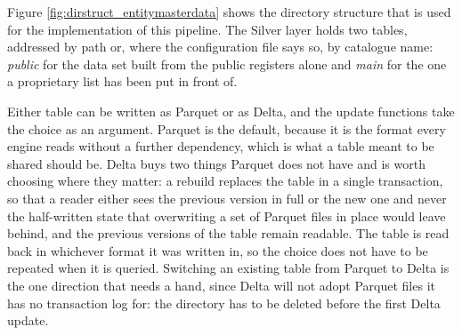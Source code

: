 Figure \ref{fig:dirstruct_entitymasterdata} shows the directory structure that is used for the implementation of this pipeline. The Silver layer holds two tables, addressed by path or, where the configuration file says so, by catalogue name: \emph{public} for the data set built from the public registers alone and \emph{main} for the one a proprietary list has been put in front of.

Either table can be written as Parquet or as Delta, and the update functions take the choice as an argument. Parquet is the default, because it is the format every engine reads without a further dependency, which is what a table meant to be shared should be. Delta buys two things Parquet does not have and is worth choosing where they matter: a rebuild replaces the table in a single transaction, so that a reader either sees the previous version in full or the new one and never the half-written state that overwriting a set of Parquet files in place would leave behind, and the previous versions of the table remain readable. The table is read back in whichever format it was written in, so the choice does not have to be repeated when it is queried. Switching an existing table from Parquet to Delta is the one direction that needs a hand, since Delta will not adopt Parquet files it has no transaction log for: the directory has to be deleted before the first Delta update.

